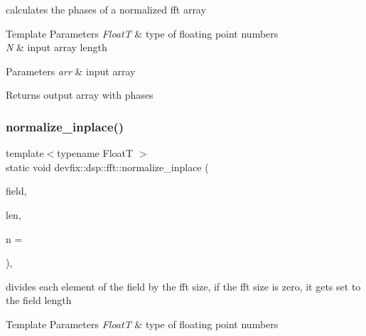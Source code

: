 calculates the phases of a normalized fft array 


\begin{DoxyTemplParams}{Template Parameters}
{\em FloatT} & type of floating point numbers \\
\hline
{\em N} & input array length \\
\hline
\end{DoxyTemplParams}

\begin{DoxyParams}{Parameters}
{\em arr} & input array \\
\hline
\end{DoxyParams}
\begin{DoxyReturn}{Returns}
output array with phases 
\end{DoxyReturn}
\mbox{\label{structdevfix_1_1dsp_1_1fft_ac05e043eb9375c77ff7e4ab5843d82af}} 
\subsubsection{\texorpdfstring{normalize\+\_\+inplace()}{normalize\_inplace()}\hspace{0.1cm}{\footnotesize\ttfamily [1/3]}}
{\footnotesize\ttfamily template$<$typename FloatT $>$ \\
static void devfix\+::dsp\+::fft\+::normalize\+\_\+inplace (\begin{DoxyParamCaption}\item[{std\+::complex$<$ FloatT $>$ $\ast$}]{field,  }\item[{std\+::size\+\_\+t}]{len,  }\item[{std\+::size\+\_\+t}]{n = {} }\end{DoxyParamCaption})\hspace{0.3cm}{\ttfamily [inline]}, {\ttfamily [static]}}



divides each element of the field by the fft size, if the fft size is zero, it gets set to the field length 


\begin{DoxyTemplParams}{Template Parameters}
{\em FloatT} & type of floating point numbers \\
\hline
\end{DoxyTemplParams}

